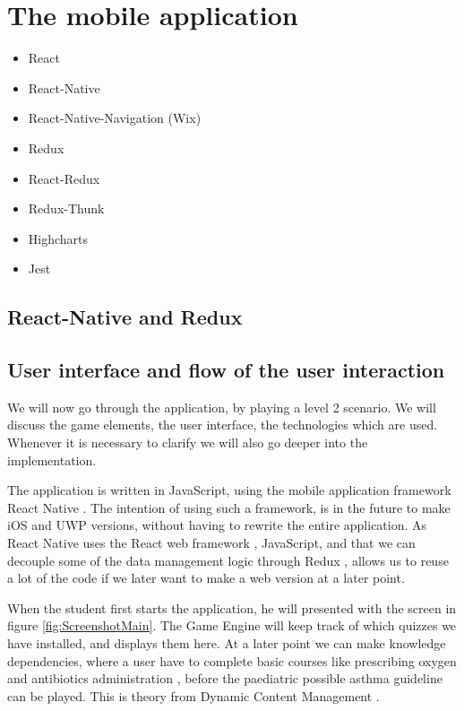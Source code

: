 \section{The mobile application}
\begin{itemize}
	\item React
	\item React-Native
	\item React-Native-Navigation (Wix)
	\item Redux
	\item React-Redux
	\item Redux-Thunk
	\item Highcharts
	\item Jest
\end{itemize}
\subsection{React-Native and Redux}
\subsection{User interface and flow of the user interaction}

We will now go through the application, by playing a level 2 scenario. We will discuss the game elements, the user interface, the technologies which are used. Whenever it is necessary to clarify we will also go deeper into the implementation.

The application is written in JavaScript, using the mobile application framework React Native \parencite{ReactNative}. The intention of using such a framework, is in the future to make iOS and UWP versions, without having to rewrite the entire application. As React Native uses the React web framework \parencite{React}, JavaScript, and that we can decouple some of the data management logic through Redux \parencite{Redux}, allows us to reuse a lot of the code if we later want to make a web version at a later point.

When the student first starts the application, he will presented with the screen in figure \ref{fig:ScreenshotMain}. The Game Engine will keep track of which quizzes we have installed, and displays them here. At a later point we can make knowledge dependencies, where a user have to complete basic courses like prescribing oxygen \parencite{RepublicofKeny2016} and antibiotics administration \parencite{RepublicofKeny2016}, before the paediatric possible asthma guideline \parencite{RepublicofKeny2016} can be played. This is theory from Dynamic Content Management \parencite{Eide2008}.

